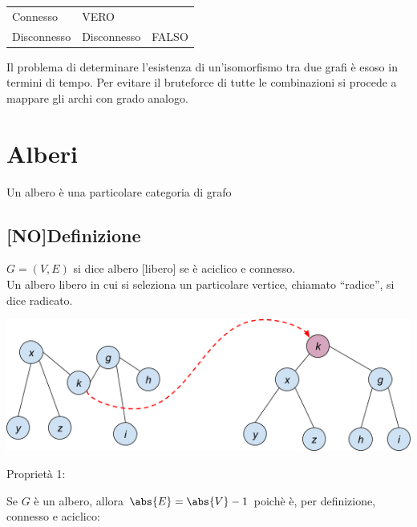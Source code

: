 \documentclass[tikz]{article}
\begin{document}
{{\begin{longtable}[]{@{}lll@{}}
\begin{minipage}[t]{0.30\columnwidth}
{Connesso}\strut
\end{minipage} & \begin{minipage}[t]{0.30\columnwidth}\raggedright\strut
{VERO}\strut
\end{minipage}\tabularnewline
\begin{minipage}[t]{0.30\columnwidth}\raggedright\strut
{Disconnesso}\strut
\end{minipage} & \begin{minipage}[t]{0.30\columnwidth}\raggedright\strut
{Disconnesso}\strut
\end{minipage} & \begin{minipage}[t]{0.30\columnwidth}\raggedright\strut
{FALSO}\strut
\end{minipage}\tabularnewline
\bottomrule
\end{longtable}

{Il problema di determinare l'esistenza di un'isomorfismo tra due grafi è esoso in termini di tempo. Per evitare il bruteforce di tutte le combinazioni si procede a mappare gli archi con grado analogo.}

\section{Alberi}

{Un albero è una particolare categoria di grafo}

\subsection{{[}NO{]}Definizione}

$G=(V,E)$ si dice albero {[}libero{]} se è aciclico e connesso.\\
Un albero libero in cui si seleziona un particolare vertice, chiamato ``radice'', si dice radicato.

{\includegraphics{images/image533.png}}

{Proprietà 1:}

Se $G$ è un albero, allora $\abs{E} = \abs{V} - 1$ poichè è, per definizione, connesso e aciclico:

}}
\end{document}
